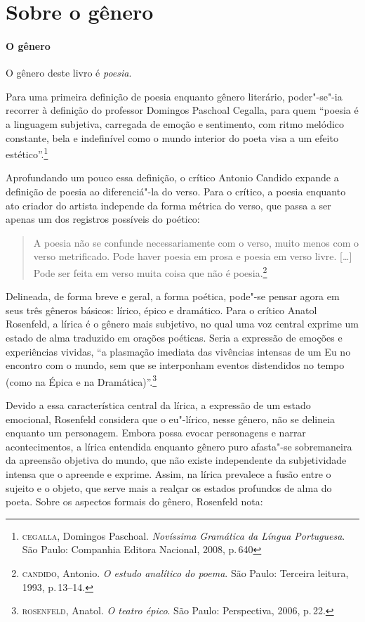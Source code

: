 \documentclass[11pt]{extarticle}
\begin{document}
\section{Sobre o gênero}

\paragraph{O gênero} O gênero deste livro é \textit{poesia}. 

Para uma primeira definição de poesia enquanto gênero literário, poder"-se"-ia recorrer à definição do professor Domingos Paschoal Cegalla, para quem ``poesia é a linguagem subjetiva, carregada de emoção e sentimento, com ritmo melódico constante, bela e indefinível como o mundo interior do poeta visa a um efeito estético''.\footnote{\textsc{cegalla}, Domingos Paschoal. \textit{Novíssima Gramática da Língua Portuguesa}. São Paulo: Companhia Editora Nacional, 2008, p.\,640}

Aprofundando um pouco essa definição, o crítico Antonio Candido expande a definição de poesia ao diferenciá"-la do verso.
Para o crítico, a poesia enquanto ato criador do artista independe da forma métrica do verso, que passa a ser apenas um dos registros possíveis do poético:

\begin{quote}
A poesia não se confunde necessariamente com o verso, muito menos com o verso metrificado. Pode haver poesia em prosa e poesia em verso livre. [\ldots]
Pode ser feita em verso muita coisa que não é poesia.\footnote{\textsc{candido}, Antonio. \textit{O estudo analítico do poema}. São Paulo: Terceira leitura, 1993, p.\,13--14.}
\end{quote}

Delineada, de forma breve e geral, a forma poética, pode"-se pensar agora em seus três gêneros básicos: lírico, épico e dramático.
Para o crítico Anatol Rosenfeld, a lírica é o gênero mais subjetivo, no qual uma voz central exprime um estado de alma traduzido em orações poéticas.
Seria a expressão de emoções e experiências vividas, ``a plasmação imediata das vivências intensas de um Eu no encontro com o mundo, sem que se interponham eventos distendidos no tempo (como na Épica e na Dramática)''.\footnote{\textsc{rosenfeld}, Anatol. \textit{O teatro épico}. São Paulo: Perspectiva, 2006, p.\,22.}

Devido a essa característica central da lírica, a expressão de um estado emocional, Rosenfeld considera que o eu"-lírico, nesse gênero, não se delineia enquanto um personagem. Embora possa evocar personagens e narrar acontecimentos, a lírica entendida enquanto gênero puro afasta"-se sobremaneira da apreensão objetiva do mundo, que não existe independente da subjetividade intensa que o apreende e exprime. Assim, na lírica prevalece a fusão entre o sujeito e o objeto, que serve mais a realçar os estados profundos de alma do poeta.
Sobre os aspectos formais do gênero, Rosenfeld nota:
\end{document}

